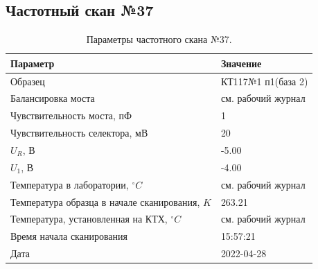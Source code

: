 \subsection{Частотный скан №37}
\begin{table}[!ht]
    \centering
    \caption{Параметры частотного скана №37.}
    \begin{tabular}{|l|l|}
        \hline
        Параметр                                       & Значение                  \\ \hline
        Образец                                        & КТ117№1 п1(база 2)        \\ \hline
        Балансировка моста                             & см. рабочий журнал        \\ \hline
        Чувствительность моста, пФ                     & 1                         \\ \hline
        Чувствительность селектора, мВ                 & 20                        \\ \hline
        $U_R$, В                                       & -5.00                     \\ \hline
        $U_1$, В                                       & -4.00                     \\ \hline
        Температура в лаборатории, $^\circ C$          & см. рабочий журнал        \\ \hline
        Температура образца в начале сканирования, $K$ & 263.21                    \\ \hline
        Температура, установленная на КТХ, $^\circ C$  & см. рабочий журнал        \\ \hline
        Время начала сканирования                      & 15:57:21                  \\ \hline
        Дата                                           & 2022-04-28                \\ \hline
    \end{tabular}
    \label{table:frequency_scan_37}
\end{table}

